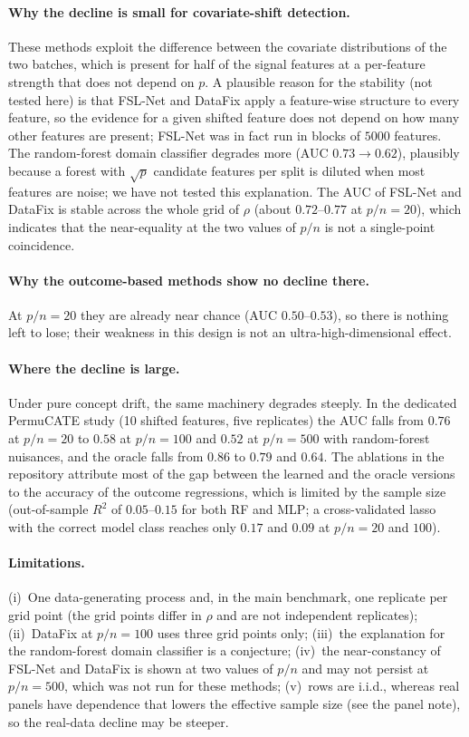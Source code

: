 \documentclass[11pt]{article}
\begin{document}
\paragraph{Why the decline is small for covariate-shift detection.}
These methods exploit the difference between the covariate distributions of the two batches, which is present for half of the signal features at a per-feature strength that does not depend on $p$. A plausible reason for the stability (not tested here) is that FSL-Net and DataFix apply a feature-wise structure to every feature, so the evidence for a given shifted feature does not depend on how many other features are present; FSL-Net was in fact run in blocks of $5000$ features. The random-forest domain classifier degrades more (AUC $0.73\to0.62$), plausibly because a forest with $\sqrt p$ candidate features per split is diluted when most features are noise; we have not tested this explanation. The AUC of FSL-Net and DataFix is stable across the whole grid of $\rho$ (about $0.72$--$0.77$ at $p/n=20$), which indicates that the near-equality at the two values of $p/n$ is not a single-point coincidence.

\paragraph{Why the outcome-based methods show no decline there.}
At $p/n=20$ they are already near chance (AUC $0.50$--$0.53$), so there is nothing left to lose; their weakness in this design is not an ultra-high-dimensional effect.

\paragraph{Where the decline is large.}
Under pure concept drift, the same machinery degrades steeply. In the dedicated PermuCATE study (10 shifted features, five replicates) the AUC falls from $0.76$ at $p/n=20$ to $0.58$ at $p/n=100$ and $0.52$ at $p/n=500$ with random-forest nuisances, and the oracle falls from $0.86$ to $0.79$ and $0.64$. The ablations in the repository attribute most of the gap between the learned and the oracle versions to the accuracy of the outcome regressions, which is limited by the sample size (out-of-sample $R^2$ of $0.05$--$0.15$ for both RF and MLP; a cross-validated lasso with the correct model class reaches only $0.17$ and $0.09$ at $p/n=20$ and $100$).

\paragraph{Limitations.}
(i)~One data-generating process and, in the main benchmark, one replicate per grid point (the grid points differ in $\rho$ and are not independent replicates); (ii)~DataFix at $p/n=100$ uses three grid points only; (iii)~the explanation for the random-forest domain classifier is a conjecture; (iv)~the near-constancy of FSL-Net and DataFix is shown at two values of $p/n$ and may not persist at $p/n=500$, which was not run for these methods; (v)~rows are i.i.d., whereas real panels have dependence that lowers the effective sample size (see the panel note), so the real-data decline may be steeper.
\end{document}
